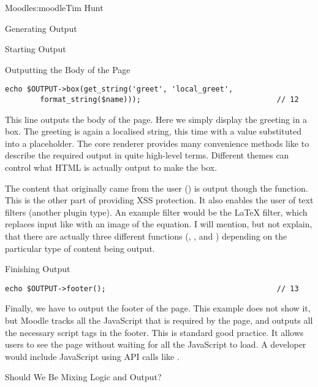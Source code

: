 \begin{aosachapter}{Moodle}{s:moodle}{Tim Hunt}
\begin{aosasect1}{Generating Output}
\begin{aosasect2}{Starting Output}
\end{aosasect2}

\begin{aosasect2}{Outputting the Body of the Page}

\begin{verbatim}
echo $OUTPUT->box(get_string('greet', 'local_greet',
        format_string($name)));                               // 12
\end{verbatim}

This line outputs the body of the page. Here we simply display the
greeting in a box. The greeting is again a localised string, this time
with a value substituted into a placeholder. The core renderer
 provides many convenience methods like  to
describe the required output in quite high-level terms. Different
themes can control what HTML is actually output to make the box.

The content that originally came from the user () is
output though the  function. This is the other
part of providing XSS protection. It also enables the user of text
filters (another plugin type). An example filter would be the LaTeX
filter, which replaces input like  with an image
of the equation. I will mention, but not explain, that there are
actually three different functions (, ,
and ) depending on the particular type of content
being output.

\end{aosasect2}

\begin{aosasect2}{Finishing Output}

\begin{verbatim}
echo $OUTPUT->footer();                                       // 13
\end{verbatim}

Finally, we have to output the footer of the page. This example does
not show it, but Moodle tracks all the JavaScript that is required by
the page, and outputs all the necessary script tags in the
footer. This is standard good practice. It allows users to see the
page without waiting for all the JavaScript to load. A developer would
include JavaScript using API calls like
.

\end{aosasect2}

\begin{aosasect2}{Should We Be Mixing Logic and Output?}


\end{aosasect2}
\end{aosasect1}
\end{aosachapter}
